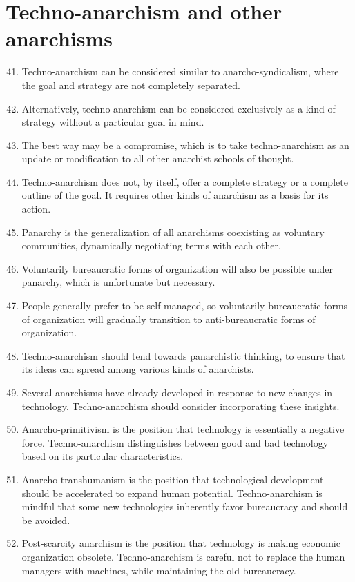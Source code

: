 \documentclass{article}
\begin{document}
\section{Techno-anarchism and other anarchisms}
\begin{enumerate}
\setcounter{enumi}{40}
\item Techno-anarchism can be considered similar to anarcho-syndicalism, where the goal and strategy are not completely separated.
\item Alternatively, techno-anarchism can be considered exclusively as a kind of strategy without a particular goal in mind.
\item The best way may be a compromise, which is to take techno-anarchism as an update or modification to all other anarchist schools of thought.
\item Techno-anarchism does not, by itself, offer a complete strategy or a complete outline of the goal. It requires other kinds of anarchism as a basis for its action.
\item Panarchy is the generalization of all anarchisms coexisting as voluntary communities, dynamically negotiating terms with each other.
\item Voluntarily bureaucratic forms of organization will also be possible under panarchy, which is unfortunate but necessary.
\item People generally prefer to be self-managed, so voluntarily bureaucratic forms of organization will gradually transition to anti-bureaucratic forms of organization.
\item Techno-anarchism should tend towards panarchistic thinking, to ensure that its ideas can spread among various kinds of anarchists.
\item Several anarchisms have already developed in response to new changes in technology. Techno-anarchism should consider incorporating these insights.
\item Anarcho-primitivism is the position that technology is essentially a negative force. Techno-anarchism distinguishes between good and bad technology based on its particular characteristics.
\item Anarcho-transhumanism is the position that technological development should be accelerated to expand human potential. Techno-anarchism is mindful that some new technologies inherently favor bureaucracy and should be avoided.
\item Post-scarcity anarchism is the position that technology is making economic organization obsolete. Techno-anarchism is careful not to replace the human managers with machines, while maintaining the old bureaucracy.

\end{enumerate}
\end{document}
